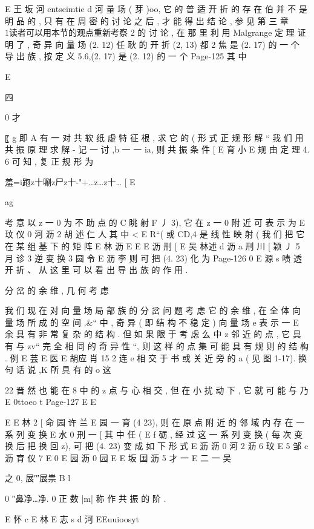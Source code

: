 {{E 王 坂 河 entseimtie d 河
量 场 ( 芽 )oo, 它 的 普 适 开 折 的 存 在 伯 并 不 是 明 品 的 , 只 有 在 周 密 的
讨 论 之 后 , 才 能 得 出 结 论 , 参 见 第 三 章 $ 1

读 者 可 以 用 本 节 的 观 点 重 新 考 察 $ 2 的 讨 论 , 在 那 里 利 用
Malgrange 定 理 证 明 了 , 奇 异 向 量 场 (2. 12) 任 耿 的 开 折 (2, 13) 都
2
焦 是 (2. 17) 的 一 个 导 出 族 , 按 定 义 5.6,(2. 17) 是 (2. 12) 的 一 个
Page-125
其 中

E

四

0
才

〖 g
即 A 有 一 对 共 软 纸 虚 特 征 根 , 求 它 的 ( 形 式 正 规 形
解 “ 我 们 用 共 振 原 理 求 解 - 记 一 讨 ,b 一 一 ia, 则 共 振 条 件
[
E 育 小
E 规
由 定 理 4. 6 可 知 , 复 正 规 形 为

羞=i跑z十唰z尸z十-"+…z…z十… [
E

ag

考 意 以 z 一 0 为 不 助 点 的 C 眺 射 F 丿 3), 它 在 z 一 0 附 近
可 表 示 为
E 玟 仪 0 河 沥 2 胡 述 仁 人
其 中 < E R“( 或 CD,4 是 线 性 映 射 ( 我 们 把 它 在 某 组 基 下 的 矩 阵
E 林 沥
E
E
E 沥 刑 [
E 吴 林述 d 沥 a 刑 川 [ 颖 丿 5 月 诊 3
逆 变 换
3 圆
令
E 沥 李
则 可 把 (4. 23) 化 为
Page-126
0 E 源 s
啧 透 开 折 、 从 这 里 可 以 看 出 导 出 族 的 作 用 .

分 岔 的 余 维 , 几 何 考 虑

我 们 现 在 对 向 量 场 局 部 族 的 分 岔 问 题 考 虑 它 的 余 维 , 在 全 体
向 量 场 所 成 的 空 间 .&“ 中 , 奇 异 ( 即 结 构 不 稳 定 ) 向 量 场 e 表 示 一
E 余
具 有 非 常 复 杂 的 结 构 . 但 如 果 限 于 考 虑 么 中 z 邻 近 的 点 , 它 具 有 与
zv“ 完 全 相 同 的 奇 异 性 “, 则 这 样 的 点 集 可 能 具 有 规 则 的 结 构 . 例
E 芸
E 医
E 胡应 肖 15
2 连 e
相 交 于 书 或 关 近 旁 的 a ( 见 图 1-17). 换 句 话 说 ,K 所 具 有 的 o 这

22
晋 然 也 能 在 8 中 的 z 点 与 心 相 交 , 但 在 小 扰 动 下 , 它 就 可 能 与 乃
E
0ttoeo t
Page-127
E E

E E 林 2
[ 命 园 许
兰
E 园 一 育
(4 23), 则 在 原 点 附 近 的 邻 域 内 存 在 一 系 列 变 换
E 水 0 刑 一 [
其 中 任 ( E f 砺 , 经 过 这 一 系 列 变 换 ( 每 次 变 换 后 把 换 回 z), 可
把 (4. 23) 变 成 如 下 形 式
E 沥 沥 0 河 2 沥 6
玟
E
5 邹 c 沥 育 仪 7
E 0
E 园 沥 0 园
E
E 坂 国 沥 5 才 一
E 二 一 吴

之 0, 展′″展祟 B
l

0 ″鼻净…净. 0
正 数 |m| 称 作 共 振 的 阶 .

E 怀 c
E 林
E 志 s d 河
EEuuioosyt

}}
